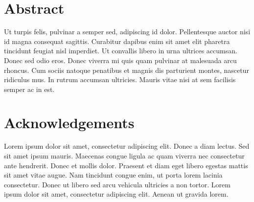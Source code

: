 \documentclass[12pt]{article}
\begin{document}
\blankpage

\section*{Abstract}
Ut turpis felis, pulvinar a semper sed, adipiscing id dolor. Pellentesque auctor nisi id magna consequat sagittis. Curabitur dapibus enim sit amet elit pharetra tincidunt feugiat nisl imperdiet. Ut convallis libero in urna ultrices accumsan. Donec sed odio eros. Donec viverra mi quis quam pulvinar at malesuada arcu rhoncus. Cum sociis natoque penatibus et magnis dis parturient montes, nascetur ridiculus mus. In rutrum accumsan ultricies. Mauris vitae nisi at sem facilisis semper ac in est.

\blankpage

\section*{Acknowledgements}
Lorem ipsum dolor sit amet, consectetur adipiscing elit. Donec a diam lectus. Sed sit amet ipsum mauris. Maecenas congue ligula ac quam viverra nec consectetur ante hendrerit. Donec et mollis dolor. Praesent et diam eget libero egestas mattis sit amet vitae augue. Nam tincidunt congue enim, ut porta lorem lacinia consectetur. Donec ut libero sed arcu vehicula ultricies a non tortor. Lorem ipsum dolor sit amet, consectetur adipiscing elit. Aenean ut gravida lorem.

\blankpage

\setcounter{tocdepth}{3}
\tableofcontents

\blankpage

\setlength{\parskip}{0.2in}







\clearpage



\blankpage

\listoffigures
{}

\blankpage

\listoftables
{}

\blankpage

\lstlistoflistings
{}
\end{document}
